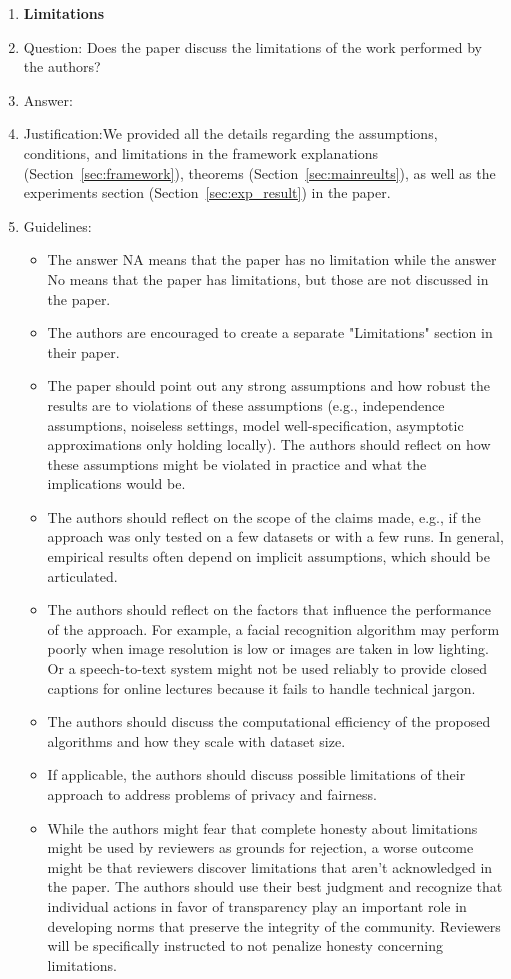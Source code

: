 \documentclass{article}
\begin{document}
\begin{enumerate}
\item {\bf Limitations}
    \item[] Question: Does the paper discuss the limitations of the work performed by the authors?
    \item[] Answer: \answerYes{} %
    \item[] Justification:We provided all the details regarding the assumptions, conditions, and limitations in the framework explanations (Section~\ref{sec:framework}), theorems (Section~\ref{sec:mainreults}), as well as the experiments section (Section~\ref{sec:exp_result}) in the paper.
    \item[] Guidelines:
    \begin{itemize}
        \item The answer NA means that the paper has no limitation while the answer No means that the paper has limitations, but those are not discussed in the paper. 
        \item The authors are encouraged to create a separate "Limitations" section in their paper.
        \item The paper should point out any strong assumptions and how robust the results are to violations of these assumptions (e.g., independence assumptions, noiseless settings, model well-specification, asymptotic approximations only holding locally). The authors should reflect on how these assumptions might be violated in practice and what the implications would be.
        \item The authors should reflect on the scope of the claims made, e.g., if the approach was only tested on a few datasets or with a few runs. In general, empirical results often depend on implicit assumptions, which should be articulated.
        \item The authors should reflect on the factors that influence the performance of the approach. For example, a facial recognition algorithm may perform poorly when image resolution is low or images are taken in low lighting. Or a speech-to-text system might not be used reliably to provide closed captions for online lectures because it fails to handle technical jargon.
        \item The authors should discuss the computational efficiency of the proposed algorithms and how they scale with dataset size.
        \item If applicable, the authors should discuss possible limitations of their approach to address problems of privacy and fairness.
        \item While the authors might fear that complete honesty about limitations might be used by reviewers as grounds for rejection, a worse outcome might be that reviewers discover limitations that aren't acknowledged in the paper. The authors should use their best judgment and recognize that individual actions in favor of transparency play an important role in developing norms that preserve the integrity of the community. Reviewers will be specifically instructed to not penalize honesty concerning limitations.
    \end{itemize}


\end{enumerate}
\end{document}
